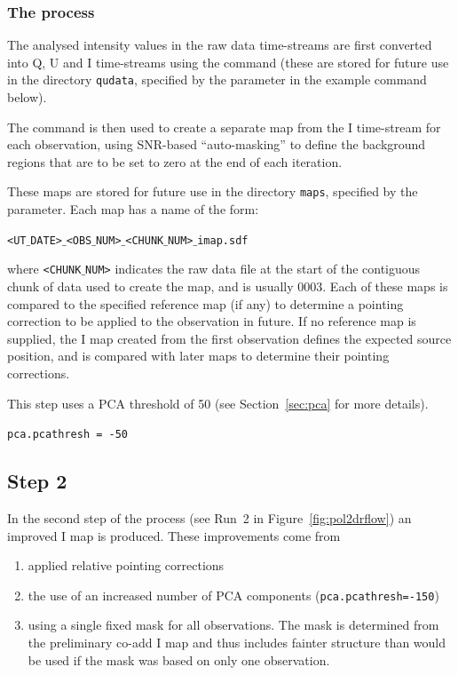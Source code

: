 \subsubsection*{The process}
The analysed intensity values in the raw data time-streams are first
converted into Q, U and I time-streams using the
 command (these are stored
for future use in the directory \texttt{qudata}, specified by the
 parameter in the example command below).

The  command is then used to
create a separate map from the I time-stream for each observation,
using SNR-based ``auto-masking'' to define the background regions that
are to be set to zero at the end of each iteration.

These maps are stored for future use in the directory \texttt{maps},
specified by the  parameter. Each map has a name of the form:

\texttt{<UT$\_$DATE>$\_$<OBS$\_$NUM>$\_$<CHUNK$\_$NUM>$\_$imap.sdf}

where \texttt{<CHUNK$\_$NUM>} indicates the raw data file at the start
of the contiguous chunk of data used to create the map, and is usually
0003.  Each of these maps is compared to the specified reference map
(if any) to determine a pointing correction to be applied to the
observation in future. If no reference map is supplied, the I map
created from the first observation defines the expected source
position, and is compared with later maps to determine their pointing
corrections.

This step uses a PCA threshold of 50 (see Section~\ref{sec:pca} for more details).

\texttt{pca.pcathresh = -50}



\subsection*{Step 2}

In the second step of the process (see Run~2 in
Figure~\ref{fig:pol2drflow}) an improved I map is produced. These
improvements come from
\begin{enumerate}
\item applied relative pointing corrections
\item the use of an increased number of PCA components
  (\texttt{pca.pcathresh=-150})
\item using a single fixed mask for all observations. The mask is
  determined from the preliminary co-add I map and thus includes
  fainter structure than would be used if the mask was based on only
  one observation.
\end{enumerate}

